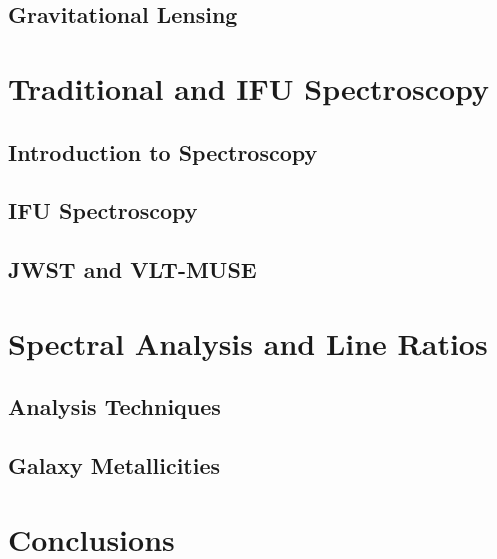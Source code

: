 \documentclass[fleqn,usenatbib]{mnras}
\begin{document}
\subsection{Gravitational Lensing}

\section{Traditional and IFU Spectroscopy}
\label{sec:spectro}
\subsection{Introduction to Spectroscopy}
\subsection{IFU Spectroscopy}
\subsection{JWST and VLT-MUSE}

\section{Spectral Analysis and Line Ratios}
\label{sec:method}
\subsection{Analysis Techniques}
\subsection{Galaxy Metallicities}

\section{Conclusions}
\label{sec:conc}














\appendix




\bsp	%
\label{lastpage}
\end{document}
